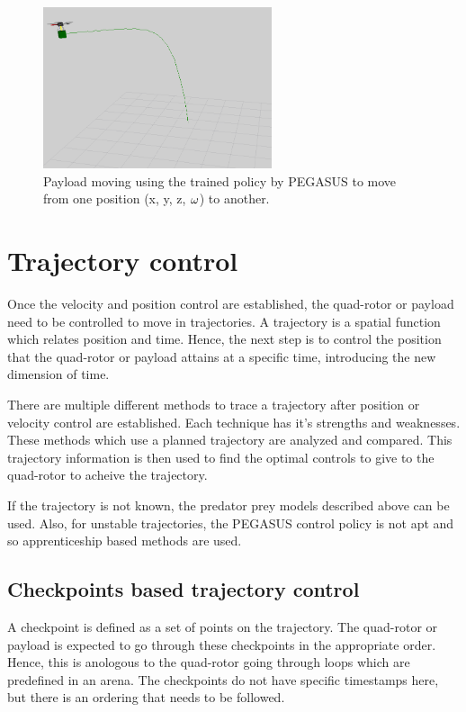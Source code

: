 \documentclass[hidelinks,BTech]{iitmdiss}
\begin{document}
\begin{figure}[H]
  \centering
    \includegraphics[width=0.6\textwidth]{payload_position_control.png}
    \caption{Payload moving using the trained policy by PEGASUS to move from one position (x, y, z, $\protect\omega$) to another.}
\end{figure}

\chapter{Trajectory control}

Once the velocity and position control are established, the quad-rotor or payload need to be controlled to move in trajectories. A trajectory is a spatial function which relates position and time. Hence, the next step is to control the position that the quad-rotor or payload attains at a specific time, introducing the new dimension of time.

There are multiple different methods to trace a trajectory after position or velocity control are established. Each technique has it's strengths and weaknesses. These methods which use a planned trajectory are analyzed and compared. This trajectory information is then used to find the optimal controls to give to the quad-rotor to acheive the trajectory.

If the trajectory is not known, the predator prey models described above can be used. Also, for unstable trajectories, the PEGASUS control policy is not apt and so apprenticeship based methods are used.

\section{Checkpoints based trajectory control}

A checkpoint is defined as a set of points on the trajectory. The quad-rotor or payload is expected to go through these checkpoints in the appropriate order. Hence, this is anologous to the quad-rotor going through loops which are predefined in an arena. The checkpoints do not have specific timestamps here, but there is an ordering that needs to be followed.
\end{document}
